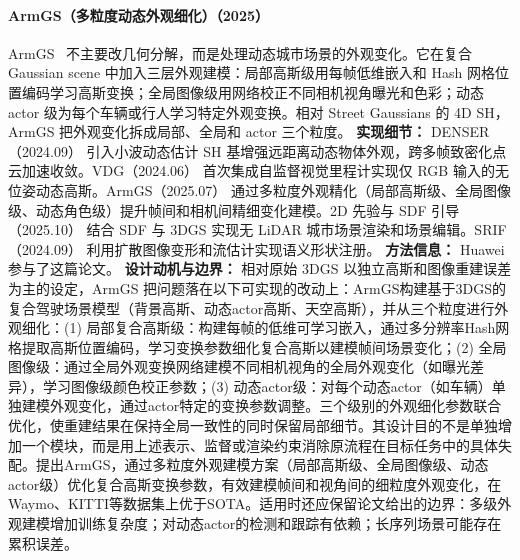 \paragraph{ArmGS（多粒度动态外观细化）（2025）}
ArmGS~\cite{2507_03886} 不主要改几何分解，而是处理动态城市场景的外观变化。它在复合 Gaussian scene 中加入三层外观建模：局部高斯级用每帧低维嵌入和 Hash 网格位置编码学习高斯变换；全局图像级用网络校正不同相机视角曝光和色彩；动态 actor 级为每个车辆或行人学习特定外观变换。相对 Street Gaussians 的 4D SH，ArmGS 把外观变化拆成局部、全局和 actor 三个粒度。
\textbf{实现细节：} DENSER（2024.09） 引入小波动态估计 SH 基增强远距离动态物体外观，跨多帧致密化点云加速收敛。VDG（2024.06） 首次集成自监督视觉里程计实现仅 RGB 输入的无位姿动态高斯。ArmGS（2025.07） 通过多粒度外观精化（局部高斯级、全局图像级、动态角色级）提升帧间和相机间精细变化建模。2D 先验与 SDF 引导（2025.10） 结合 SDF 与 3DGS 实现无 LiDAR 城市场景渲染和场景编辑。SRIF（2024.09） 利用扩散图像变形和流估计实现语义形状注册。
\textbf{方法信息：} Huawei 参与了这篇论文。
\textbf{设计动机与边界：} 相对原始 3DGS 以独立高斯和图像重建误差为主的设定，ArmGS 把问题落在以下可实现的改动上：ArmGS构建基于3DGS的复合驾驶场景模型（背景高斯、动态actor高斯、天空高斯），并从三个粒度进行外观细化：(1) 局部复合高斯级：构建每帧的低维可学习嵌入，通过多分辨率Hash网格提取高斯位置编码，学习变换参数细化复合高斯以建模帧间场景变化；(2) 全局图像级：通过全局外观变换网络建模不同相机视角的全局外观变化（如曝光差异），学习图像级颜色校正参数；(3) 动态actor级：对每个动态actor（如车辆）单独建模外观变化，通过actor特定的变换参数调整。三个级别的外观细化参数联合优化，使重建结果在保持全局一致性的同时保留局部细节。其设计目的不是单独增加一个模块，而是用上述表示、监督或渲染约束消除原流程在目标任务中的具体失配。提出ArmGS，通过多粒度外观建模方案（局部高斯级、全局图像级、动态actor级）优化复合高斯变换参数，有效建模帧间和视角间的细粒度外观变化，在Waymo、KITTI等数据集上优于SOTA。适用时还应保留论文给出的边界：多级外观建模增加训练复杂度；对动态actor的检测和跟踪有依赖；长序列场景可能存在累积误差。
